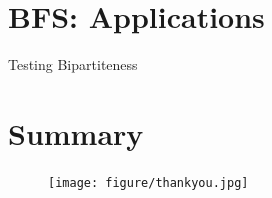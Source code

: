 \documentclass{beamer}
\begin{document}
\section{BFS: Applications}

\begin{frame}{Testing Bipartiteness}

\end{frame}
\begin{frame}{}

\end{frame}
\begin{frame}{}

\end{frame}
\section*{Summary}
\begin{frame}{}
  \begin{figure}[htp]
    \begin{center}
      \texttt{[image: figure/thankyou.jpg]}
    \end{center}
  \end{figure}
\end{frame}
\end{document}
